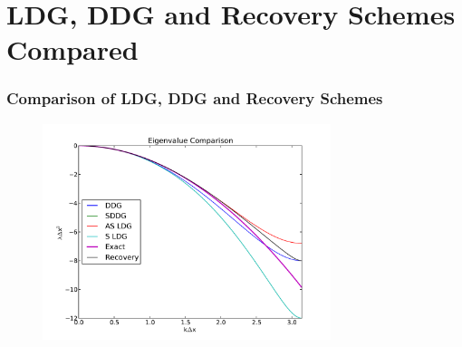 \documentclass[serif,12pt]{beamer}
\begin{document}
\section{LDG, DDG and Recovery Schemes Compared}
\begin{frame}
  \frametitle{Comparison of LDG, DDG and Recovery Schemes}
  \begin{figure}
    \includegraphics[width=0.75\textwidth]{compareDiffusionSchemes.pdf}
  \end{figure}
\end{frame}
\end{document}

